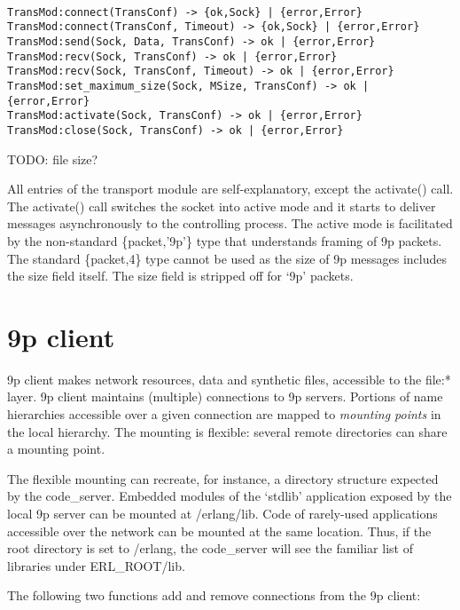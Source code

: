 \begin{adjustwidth}{2.5em}{2.5em}
\begin{verbatim}

TransMod:connect(TransConf) -> {ok,Sock} | {error,Error}
TransMod:connect(TransConf, Timeout) -> {ok,Sock} | {error,Error}
TransMod:send(Sock, Data, TransConf) -> ok | {error,Error}
TransMod:recv(Sock, TransConf) -> ok | {error,Error}
TransMod:recv(Sock, TransConf, Timeout) -> ok | {error,Error}
TransMod:set_maximum_size(Sock, MSize, TransConf) -> ok | {error,Error}
TransMod:activate(Sock, TransConf) -> ok | {error,Error}
TransMod:close(Sock, TransConf) -> ok | {error,Error}

\end{verbatim}
\end{adjustwidth}

TODO: file size?

All entries of the transport module are self-explanatory, except the activate()
call. The activate() call switches the socket into active mode and it starts to
deliver messages asynchronously to the controlling process. The active mode is
facilitated by the non-standard \{packet,'9p'\} type that understands
framing of 9p packets. The standard \{packet,4\} type cannot be used as the
size of 9p messages includes the size field itself. The size field is stripped
off for `9p' packets.

\chapter{9p client}
\label{pclient}

9p client makes network resources, data and synthetic files, accessible to the
file:* layer. 9p client maintains (multiple) connections to 9p
servers. Portions of name hierarchies accessible over a given connection are
mapped to \emph{mounting points} in the local hierarchy. The mounting is
flexible: several remote directories can share a mounting point.

The flexible mounting can recreate, for instance, a directory structure expected
by the code\_server. Embedded modules of the `stdlib' application exposed by the
local 9p server can be mounted at \slash erlang\slash lib. Code of rarely-used
applications accessible over the network can be mounted at the same location.
Thus, if the root directory is set to \slash erlang, the code\_server will see
the familiar list of libraries under ERL\_ROOT\slash lib.

The following two functions add and remove connections from the 9p client:

